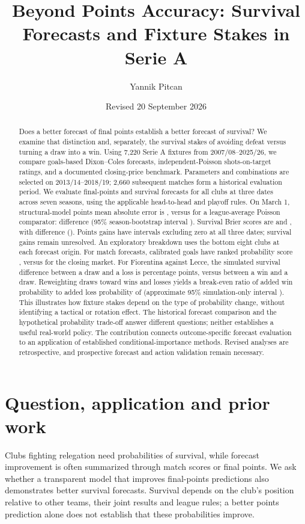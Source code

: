 \documentclass[11pt]{article}
\title{Beyond Points Accuracy: Survival Forecasts and Fixture Stakes in Serie A}
\author{Yannik Pitcan}
\date{Revised 20 September 2026}
\begin{document}
\maketitle
\begin{abstract}
Does a better forecast of final points establish a better forecast of survival?
We examine that distinction and, separately, the survival stakes of avoiding
defeat versus turning a draw into a win.
Using 7,220 Serie A fixtures from 2007/08--2025/26, we compare goals-based
Dixon--Coles forecasts, independent-Poisson shots-on-target ratings, and a
documented closing-price benchmark. Parameters and combinations are selected on
2013/14--2018/19; 2,660 subsequent matches form a historical evaluation period.
We evaluate final-points and survival forecasts for all clubs at three dates
across seven seasons, using the applicable head-to-head and playoff rules.
On March 1, structural-model points mean absolute error is \SeasonMarchMAE{},
versus \SeasonMarchBaselineMAE{} for a league-average Poisson comparator:
difference \SeasonMarchMAEDifference{} (95\% season-bootstrap interval
\SeasonMarchMAECI{}). Survival Brier scores are \SeasonMarchBrier{} and
\SeasonMarchBaseline{}, with difference \SeasonMarchDifference{}
(\SeasonMarchDifferenceCI{}). Points gains have intervals excluding zero at
all three dates; survival gains remain unresolved. An exploratory breakdown
uses the bottom eight clubs at each forecast origin.
For match forecasts, calibrated goals have ranked probability score
\GoalsRPS{}, versus \MarketRPS{} for the closing market.
For Fiorentina against Lecce, the simulated survival difference between a draw
and a loss is \LecceDrawBenefit{} percentage points, versus \LecceWinBenefit{}
between a win and a draw. Reweighting draws toward wins and losses yields a
break-even ratio of added win probability to added loss probability of
\LecceBreakEven{} (approximate 95\% simulation-only interval
\LecceBreakEvenCI{}). This illustrates how fixture stakes depend on the type
of probability change, without identifying a tactical or rotation effect.
The historical forecast comparison and the hypothetical probability trade-off
answer different questions; neither establishes a useful real-world policy.
The contribution connects outcome-specific forecast evaluation to an
application of established conditional-importance methods. Revised analyses
are retrospective, and prospective forecast and action validation remain
necessary.
\end{abstract}

\section{Question, application and prior work}
Clubs fighting relegation need probabilities of survival, while forecast
improvement is often summarized through match scores or final points. We ask
whether a transparent model that improves final-points predictions also
demonstrates better survival forecasts. Survival depends on the club's position
relative to other teams, their joint results and league rules; a better points
prediction alone does not establish that these probabilities improve.
\end{document}
